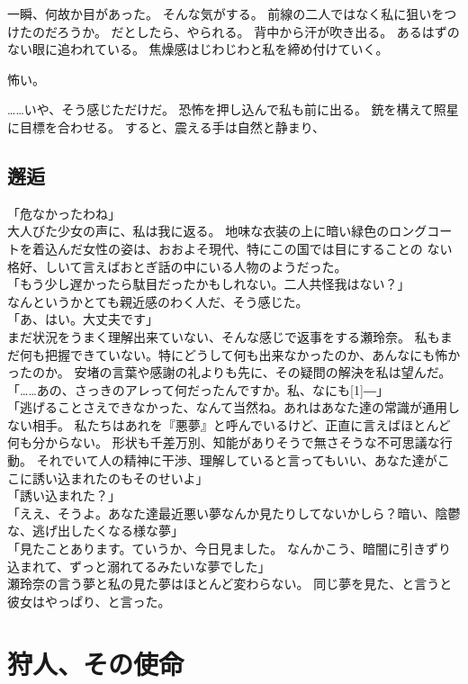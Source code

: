 \documentclass[autodetect-engine,dvipdfmx-if-dvi,a5paper,ja=standard,twoside,titlepage,final,twocolumn]{ltjtbook}
\begin{document}
一瞬、何故か目があった。
そんな気がする。
前線の二人ではなく私に狙いをつけたのだろうか。
だとしたら、やられる。
背中から汗が吹き出る。
あるはずのない眼に追われている。
焦燥感はじわじわと私を締め付けていく。

怖い。

……いや、そう感じただけだ。
恐怖を押し込んで私も前に出る。
銃を構えて照星に目標を合わせる。
すると、震える手は自然と静まり、
\section{\rm 邂逅}

「危なかったわね」\\
大人びた少女の声に、私は我に返る。
地味な衣装の上に暗い緑色のロングコートを着込んだ女性の姿は、おおよそ現代、特にこの国では目にすることの
ない格好、しいて言えばおとぎ話の中にいる人物のようだった。\\
「もう少し遅かったら駄目だったかもしれない。二人共怪我はない？」\\
なんというかとても親近感のわく人だ、そう感じた。\\
「あ、はい。大丈夫です」\\
まだ状況をうまく理解出来ていない、そんな感じで返事をする瀬玲奈。
私もまだ何も把握できていない。特にどうして何も出来なかったのか、あんなにも怖かったのか。
安堵の言葉や感謝の礼よりも先に、その疑問の解決を私は望んだ。\\
「……あの、さっきのアレって何だったんですか。私、なにも\scalebox{3}[1]{―}」\\
「逃げることさえできなかった、なんて当然ね。あれはあなた達の常識が通用しない相手。
私たちはあれを『悪夢』と呼んでいるけど、正直に言えばほとんど何も分からない。
形状も千差万別、知能がありそうで無さそうな不可思議な行動。
それでいて人の精神に干渉、理解していると言ってもいい、あなた達がここに誘い込まれたのもそのせいよ」\\
「誘い込まれた？」\\
「ええ、そうよ。あなた達最近悪い夢なんか見たりしてないかしら？暗い、陰鬱な、逃げ出したくなる様な夢」\\
「見たことあります。ていうか、今日見ました。
なんかこう、暗闇に引きずり込まれて、ずっと溺れてるみたいな夢でした」\\
瀬玲奈の言う夢と私の見た夢はほとんど変わらない。
同じ夢を見た、と言うと彼女はやっぱり、と言った。\\

\chapter{\rm 狩人、その使命}
\end{document}
